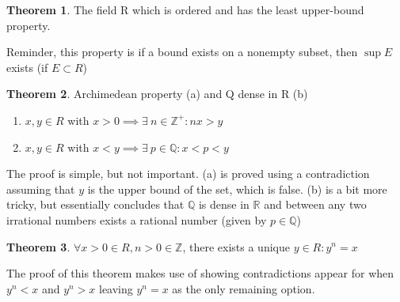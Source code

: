 \documentclass[14pt]{extarticle}
\theoremstyle{definition}
\newtheorem{theorem}{Theorem}[section]
\begin{document}
\begin{theorem}
    The field R which is ordered and has the least upper-bound property. 
\end{theorem}

Reminder, this property is if a bound exists on a nonempty subset, then $\sup E$ exists (if $E\subset R$)

\pagebreak

\begin{theorem} Archimedean property (a) and Q dense in R (b)
    \begin{enumerate}[label=(\alph*)]
        \item $x,y\in R$ with $x > 0 \implies \exists\ n\in \mathbb{Z}^+: nx > y$
        \item $x,y\in R$ with $x < y \implies \exists\ p\in \mathbb{Q}: x < p < y$
    \end{enumerate}

    The proof is simple, but not important. (a) is proved using a contradiction assuming that $y$ is the upper bound of the set, which
    is false. (b) is a bit more tricky, but essentially concludes that $\mathbb{Q}$ is dense in $\mathbb{R}$ and between any
    two irrational numbers exists a rational number (given by $p\in \mathbb{Q}$)
\end{theorem}

\begin{theorem}
    $\forall x>0\in R, n>0\in \mathbb{Z}$, there exists a unique $y\in R: y^n = x$
\end{theorem}

The proof of this theorem makes use of showing contradictions appear for when $y^n < x$ and $y^n > x$ leaving $y^n = x$ as the
only remaining option.
\end{document}
